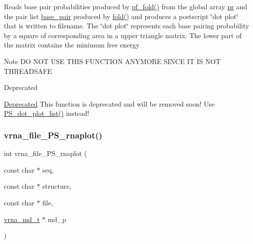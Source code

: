 Reads base pair probabilities produced by \mbox{\hyperlink{group__part__func__global__deprecated_gadc3db3d98742427e7001a7fd36ef28c2}{pf\+\_\+fold()}} from the global array \mbox{\hyperlink{fold__vars_8h_ac98ec419070aee6831b44e5c700f090f}{pr}} and the pair list \mbox{\hyperlink{fold__vars_8h_a0244a629b5ab4f58b77590c3dfd130dc}{base\+\_\+pair}} produced by \mbox{\hyperlink{group__mfe__global__deprecated_gaadafcb0f140795ae62e5ca027e335a9b}{fold()}} and produces a postscript \char`\"{}dot plot\char`\"{} that is written to \textquotesingle{}filename\textquotesingle{}. The \char`\"{}dot plot\char`\"{} represents each base pairing probability by a square of corresponding area in a upper triangle matrix. The lower part of the matrix contains the minimum free energy \begin{DoxyNote}{Note}
DO N\+OT U\+SE T\+H\+IS F\+U\+N\+C\+T\+I\+ON A\+N\+Y\+M\+O\+RE S\+I\+N\+CE IT IS N\+OT T\+H\+R\+E\+A\+D\+S\+A\+FE
\end{DoxyNote}
\begin{DoxyRefDesc}{Deprecated}
\item[\mbox{\hyperlink{deprecated__deprecated000174}{Deprecated}}]This function is deprecated and will be removed soon! Use \mbox{\hyperlink{group__plotting__utils_ga00ea223b5cf02eb2faae5ff29f0d5e12}{P\+S\+\_\+dot\+\_\+plot\+\_\+list()}} instead! \end{DoxyRefDesc}
\mbox{\label{group__plotting__utils_gabdc8f6548ba4a3bc3cd868ccbcfdb86a}} 
\subsubsection{\texorpdfstring{vrna\_file\_PS\_rnaplot()}{vrna\_file\_PS\_rnaplot()}}
{\footnotesize\ttfamily int vrna\+\_\+file\+\_\+\+P\+S\+\_\+rnaplot (\begin{DoxyParamCaption}\item[{const char $\ast$}]{seq,  }\item[{const char $\ast$}]{structure,  }\item[{const char $\ast$}]{file,  }\item[{\mbox{\hyperlink{group__model__details_ga1f8a10e12a0a1915f2a4eff0b28ea17c}{vrna\+\_\+md\+\_\+t}} $\ast$}]{md\+\_\+p }\end{DoxyParamCaption})}



